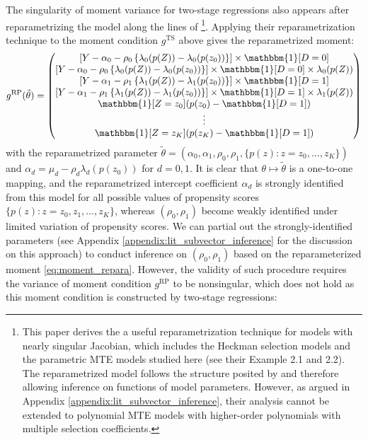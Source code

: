 \documentclass[11pt]{article}
\theoremstyle{definition}
\newcommand{\0}{\ensuremath{\mathbf{0}}}
\newcommand{\indicator}{\ensuremath{\mathbbm{1}}}
\begin{document}
\begin{bibunit}
The singularity of moment variance for two-stage regressions also appears after reparametrizing the model along the lines of \cite{han/mccloskey:2019}\footnote{This paper derives the a useful reparametrization technique for models with nearly singular Jacobian, which includes the Heckman selection models and the parametric MTE models studied here (see their Example 2.1 and 2.2). The reparametrized model follows the structure posited by \cite{andrews/cheng:2012, andrews/cheng:2013, andrews/cheng:2014} and therefore allowing  inference on functions of model parameters. However, as argued in Appendix \ref{appendix:lit_subvector_inference}, their analysis cannot be extended to polynomial MTE models with higher-order polynomials with multiple selection coefficients.}. Applying their reparametrization technique to the moment condition $g^{\text{TS}}$ above gives the reparametrized moment:
\begin{equation}
\label{eq:moment_repara}
    g^{\text{RP}}(\tilde{\theta}) 
    =
    \begin{pmatrix}
    [Y - \alpha_0 - \rho_0\left\{\lambda_0(p(Z)) - \lambda_0(p(z_0))\right\}] \times \indicator[D=0] \\
    [Y - \alpha_0 - \rho_0\left\{\lambda_0(p(Z)) - \lambda_0(p(z_0))\right\}] \times \indicator[D=0] \times \lambda_0(p(Z)) \\
    [Y - \alpha_1 - \rho_1\left\{\lambda_1(p(Z)) - \lambda_1(p(z_0))\right\}] \times \indicator[D=1] \\
    [Y - \alpha_1 - \rho_1\left\{\lambda_1(p(Z)) - \lambda_1(p(z_0))\right\}] \times \indicator[D=1] \times \lambda_1(p(Z)) \\
    \indicator[Z=z_0] (p(z_0) - \indicator[D=1]) \\
    \vdots \\
    \indicator[Z=z_K] (p(z_K) - \indicator[D=1])
    \end{pmatrix}
\end{equation}
with the reparametrized parameter $\tilde{\theta} = (\alpha_0, \alpha_1, \rho_0, \rho_1, \{p(z): z = z_0, \ldots, z_K\})$ and $\alpha_d = \mu_d - \rho_d \lambda_d(p(z_0))$ for $d = 0,1$. It is clear that $\theta \mapsto \tilde{\theta}$ is a one-to-one mapping, and the reparametrized intercept coefficient $\alpha_d$ is strongly identified from this model for all possible values of propensity scores $\{p(z): z = z_0, z_1,\ldots, z_K\}$, whereas $(\rho_0,\rho_1)$ become weakly identified under limited variation of propensity scores. We can partial out the strongly-identified parameters (see Appendix \ref{appendix:lit_subvector_inference} for the discussion on this approach) to conduct inference on $(\rho_0, \rho_1)$ based on the reparameterized moment \eqref{eq:moment_repara}. However, the validity of such procedure requires the variance of moment condition $g^{\text{RP}}$ to be nonsingular, which does not hold as this moment condition is constructed by two-stage regressions:

\end{bibunit}
\end{document}
